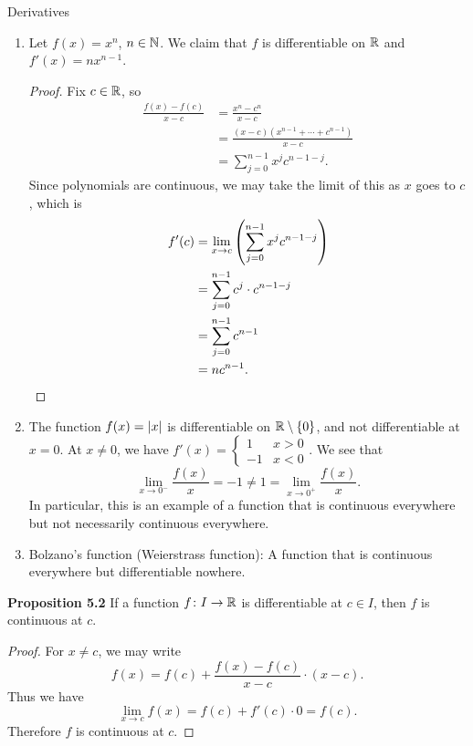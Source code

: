 \documentclass[class=article, crop=false]{standalone}
\begin{document}
  \begin{example}{Derivatives}
    \begin{enumerate}[label=\arabic*)]
      \item Let $f(x) = x^n$, $n\in\mathbb{N}$. We claim that $f$ is differentiable on $\mathbb{R}$ and $f'(x) = nx^{n - 1}$.
      \begin{proof}
        Fix $c\in\mathbb{R}$, so
        \begin{align*}
          \frac{f(x) - f(c)}{x - c} &= \frac{x^n - c^n}{x - c} \\
                                    &= \frac{(x - c)(x^{n - 1} + \dotsb + c^{n - 1})}{x - c} \\
                                    &= \sum_{j=0}^{n - 1}x^jc^{n - 1 - j}.
        \end{align*}
        Since polynomials are continuous, we may take the limit of this as $x$ goes to $c$, which is
        \begin{align*}
          f'(c) &= \lim_{x\to c} \left( \sum_{j=0}^{n - 1}x^jc^{n - 1 - j} \right) \\
                &= \sum_{j=0}^{n - 1}c^j\cdot c^{n - 1 - j} \\
                &= \sum_{j=0}^{n - 1}c^{n - 1} \\
                &= nc^{n - 1}.
        \end{align*}
      \end{proof}
      \item The function $f(x) = \left\lvert x \right\rvert$ is differentiable on $\mathbb{R}\setminus\left\{0\right\}$, and not differentiable at $x = 0$. At $x\neq 0$, we have $f'(x) = \begin{cases}1 & x > 0 \\ -1 & x < 0\end{cases}$. We see that
      \[
        \lim_{x\to 0^-} \frac{f(x)}{x} = -1\neq 1 = \lim_{x\to 0^+} \frac{f(x)}{x}.
      \]
      In particular, this is an example of a function that is continuous everywhere but not necessarily continuous everywhere.
      \item Bolzano's function (Weierstrass function): A function that is continuous everywhere but differentiable nowhere.
    \end{enumerate}
  \end{example}
  \textbf{Proposition 5.2} If a function $f\colon I\to \mathbb{R}$ is differentiable at $c\in I$, then $f$ is continuous at $c$.
  \begin{proof}
    For $x\neq c$, we may write
    \[
      f(x) = f(c) + \frac{f(x) - f(c)}{x - c}\cdot (x - c).
    \]
    Thus we have
    \[
      \lim_{x\to c} f(x) = f(c) + f'(c)\cdot 0 = f(c).
    \]
    Therefore $f$ is continuous at $c$.
  \end{proof}
\end{document}
